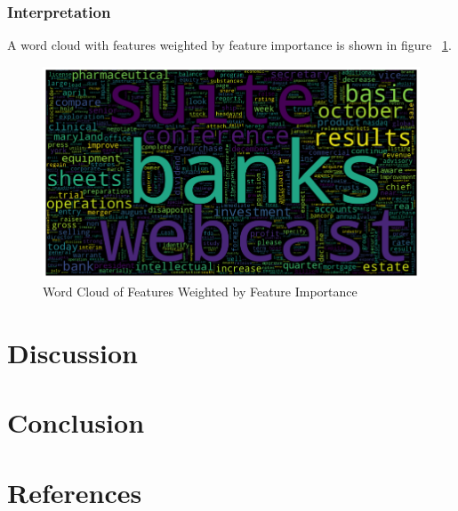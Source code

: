 \documentclass{article}
\begin{document}
	
	\subsubsection{Interpretation}
	
	A word cloud with features weighted by feature importance is shown in figure ~\ref{fig:feat_imp}.
	
	\begin{figure}[h!]
		\includegraphics[width=\linewidth]{img/feat_imp.png}
		\caption{Word Cloud of Features Weighted by Feature Importance}
		\label{fig:feat_imp}
	\end{figure}
	
	
	\section{Discussion}
	
	\section{Conclusion}
	
	\section{References}
	
\printbibliography
\end{document}
